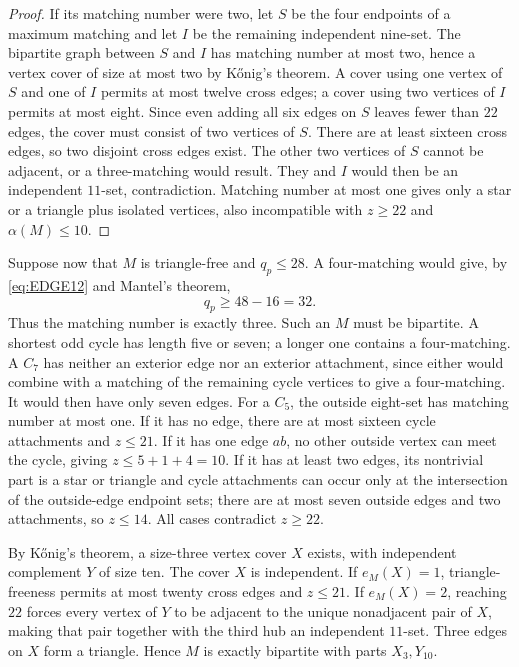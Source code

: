 \begin{proof}
If its matching number were two, let $S$ be the four endpoints of a maximum matching and let $I$ be the remaining independent nine-set. The bipartite graph between $S$ and $I$ has matching number at most two, hence a vertex cover of size at most two by K\H{o}nig's theorem. A cover using one vertex of $S$ and one of $I$ permits at most twelve cross edges; a cover using two vertices of $I$ permits at most eight. Since even adding all six edges on $S$ leaves fewer than $22$ edges, the cover must consist of two vertices of $S$. There are at least sixteen cross edges, so two disjoint cross edges exist. The other two vertices of $S$ cannot be adjacent, or a three-matching would result. They and $I$ would then be an independent $11$-set, contradiction. Matching number at most one gives only a star or a triangle plus isolated vertices, also incompatible with $z\geq22$ and $\alpha(M)\leq10$.
\end{proof}

Suppose now that $M$ is triangle-free and $q_p\leq28$. A four-matching would give, by \cref{eq:EDGE12} and Mantel's theorem,
\[
q_p\geq48-16=32.
\]
Thus the matching number is exactly three. Such an $M$ must be bipartite. A shortest odd cycle has length five or seven; a longer one contains a four-matching. A $C_7$ has neither an exterior edge nor an exterior attachment, since either would combine with a matching of the remaining cycle vertices to give a four-matching. It would then have only seven edges. For a $C_5$, the outside eight-set has matching number at most one. If it has no edge, there are at most sixteen cycle attachments and $z\leq21$. If it has one edge $ab$, no other outside vertex can meet the cycle, giving $z\leq5+1+4=10$. If it has at least two edges, its nontrivial part is a star or triangle and cycle attachments can occur only at the intersection of the outside-edge endpoint sets; there are at most seven outside edges and two attachments, so $z\leq14$. All cases contradict $z\geq22$.

By K\H{o}nig's theorem, a size-three vertex cover $X$ exists, with independent complement $Y$ of size ten. The cover $X$ is independent. If $e_M(X)=1$, triangle-freeness permits at most twenty cross edges and $z\leq21$. If $e_M(X)=2$, reaching $22$ forces every vertex of $Y$ to be adjacent to the unique nonadjacent pair of $X$, making that pair together with the third hub an independent $11$-set. Three edges on $X$ form a triangle. Hence $M$ is exactly bipartite with parts $X_3,Y_{10}$.

